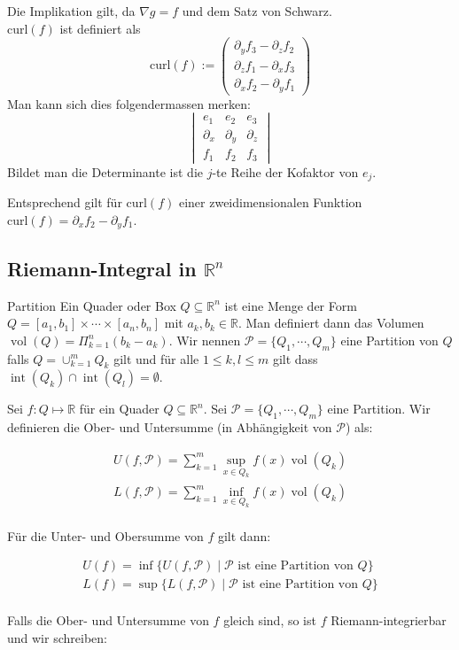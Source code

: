 \documentclass[a4paper,10pt]{article}
\def\R{\mathbb{R}}
\DeclareMathOperator{\vol}{\text{vol}}
\DeclareMathOperator{\interior}{\text{int}}
\begin{document}
 Die Implikation gilt, da $\nabla g = f$ und dem Satz von Schwarz.\\
\(\text{curl}(f)\) ist definiert als
\[\text{curl}(f) := \begin{pmatrix}
  \partial_y f_3 - \partial_z f_2 \\
  \partial_z f_1 - \partial_x f_3 \\
  \partial_x f_2 - \partial_y f_1
\end{pmatrix}\]
Man kann sich dies folgendermassen merken:\\
$$\begin{vmatrix}
  e_1 & e_2 & e_3\\
  \partial_x & \partial_y & \partial_z\\
  f_1 & f_2 & f_3
\end{vmatrix}$$
Bildet man die Determinante ist die $j$-te Reihe der Kofaktor von $e_j$.

Entsprechend gilt für $\text{curl}(f)$ einer zweidimensionalen Funktion $\text{curl}(f) = \partial_x f_2 - \partial_y f_1$.

\subsection{Riemann-Integral in \texorpdfstring{\(\R^n\)}{R^n}}
\begin{subbox}{Partition}
  Ein Quader oder Box $Q \subseteq \R^n$ ist eine Menge der Form  $Q = [a_1, b_1] \times \cdots \times [a_n, b_n]$ mit $a_k, b_k \in \R$. Man definiert dann das Volumen $\vol(Q) = \Pi_{k=1}^n (b_k - a_k)$. Wir nennen $\mathcal{P} = \{ Q_1, \cdots, Q_m \}$ eine Partition von $Q$ falls $Q = \cup_{k=1}^m Q_k$ gilt und für alle $1 \leq k, l \leq m$ gilt dass $\interior(Q_k) \cap \interior(Q_l) = \emptyset$.
\end{subbox}

Sei $f: Q \mapsto \R$ für ein Quader $Q \subseteq \R^n$. Sei $\mathcal{P} = \{Q_1, \cdots, Q_m\}$ eine Partition. Wir definieren die Ober- und Untersumme (in Abhängigkeit von $\mathcal{P}$) als:

\begin{align*}
  U(f, \mathcal{P}) = \sum_{k=1}^m \sup_{x \in Q_k} f(x) \vol(Q_k)\\
  L(f, \mathcal{P}) = \sum_{k=1}^m \inf_{x \in Q_k} f(x) \vol(Q_k)
\end{align*}
\\
Für die Unter- und Obersumme von $f$ gilt dann:

\begin{align*}
  U(f) = \inf \{ U(f, \mathcal{P}) \mid \mathcal{P}\text{ ist eine Partition von }Q \}\\
  L(f) = \sup \{ L(f, \mathcal{P}) \mid \mathcal{P}\text{ ist eine Partition von }Q \}
\end{align*}
\\
Falls die Ober- und Untersumme von $f$ gleich sind, so ist $f$ Riemann-integrierbar und wir schreiben:
\end{document}
